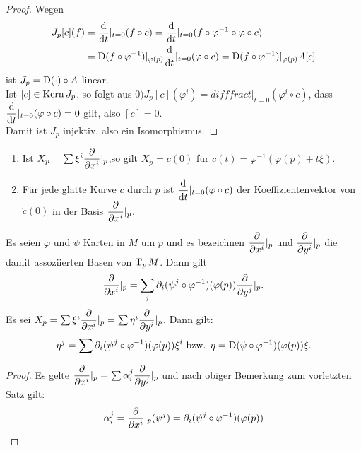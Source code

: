 \begin{proof}
  Wegen
  \begin{align*}
    J_p[c](f)& = \dfrac{\mathrm{d} }{\mathrm{d} t}|_{t=0}(f\circ c) = \dfrac{\mathrm{d} }{\mathrm{d} t}|_{t=0}(f \circ \varphi^{-1} \circ \varphi \circ c)\\
    &  = \operatorname{D}(f \circ \varphi^{-1})|_{\varphi(p)} \dfrac{\mathrm{d} }{\mathrm{d} t}|_{t=0} (\varphi \circ c) = \operatorname{D} (f\circ \varphi^{-1})|_{\varphi(p)}A[c]
  \end{align*}
  ist $J_p = \operatorname{D}(\cdot)\circ A$ linear.\\

  Ist $[c] \in \operatorname{Kern} J_p$, so folgt aus $0 ) J_p[c](\varphi^i) = difffrac{t}|_{t=0}(\varphi^i \circ c)$, dass $\dfrac{\mathrm{d} }{\mathrm{d} t}|_{t=0}(\varphi \circ c) = 0$ gilt, also $[c] = 0$.\\

  Damit ist $J_p$ injektiv, also ein Isomorphismus.
\end{proof}

\begin{bem}
  \begin{enumerate}
  \item Ist $X_p = \sum \xi^i\dfrac{\partial }{\partial x^i}|_p$,so gilt $X_p = c(0)$ für $c(t) = \varphi^{-1}(\varphi(p) + t\xi)$.
\item Für jede glatte Kurve $c$ durch $p$ ist $\dfrac{\mathrm{d} }{\mathrm{d} t}|_{t=0}(\varphi \circ c)$ der Koeffizientenvektor von $\dot c(0)$ in der Basis $\dfrac{\partial }{\partial x^i}|_p$.
  \end{enumerate}
\end{bem}


\begin{satz}
  Es seien $\varphi$ und $\psi$ Karten in $M$ um $p$ und es bezeichnen $\dfrac{\partial }{\partial x^i}|_p$ und $\dfrac{\partial }{\partial y^i}|_p$ die damit assoziierten Basen von $\operatorname{T}_pM$. Dann gilt
  \begin{align*}
    \dfrac{\partial }{\partial x^i}|_p = \sum_j \partial_i(\psi^j \circ \varphi^{-1})(\varphi(p)) \dfrac{\partial }{\partial y^j}|_p.
  \end{align*}
Es sei $X_p = \sum \xi^i \dfrac{\partial }{\partial x^i}|_p = \sum \eta^i\dfrac{\partial }{\partial y^i}|_p$. Dann gilt:
\begin{align*}
  \eta^j = \sum \partial_i(\psi^j \circ \varphi^{-1})(\varphi(p))\xi^i \text{ bzw. }
  \eta = \operatorname{D}(\psi \circ \varphi^{-1})(\varphi(p))\xi.
\end{align*}
\end{satz}

\begin{proof}
  Es gelte $\dfrac{\partial }{\partial x^i}|_p = \sum \alpha_i^j\dfrac{\partial }{\partial y^j}|_p$ und nach obiger Bemerkung zum vorletzten Satz gilt:
  \begin{align*}
    \alpha_i^j = \dfrac{\partial }{\partial x^i}|_p(\psi^j) = \partial_i(\psi^j \circ \varphi^{-1})(\varphi(p))
  \end{align*}
\end{proof}


